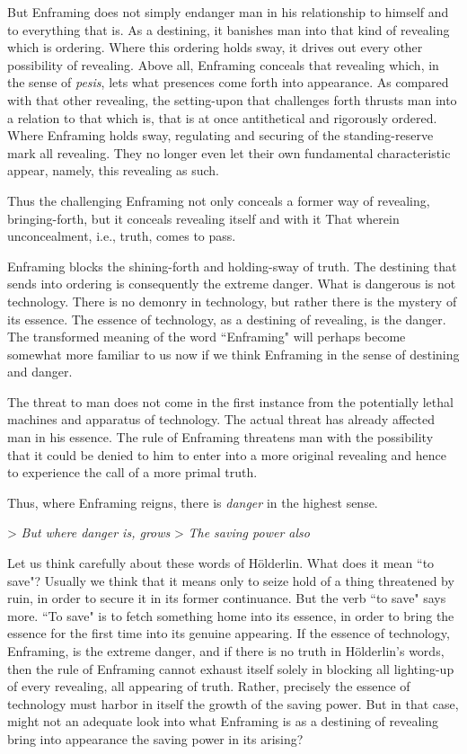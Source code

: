 But Enframing does not simply endanger man in his relationship to himself and to everything that is. As a destining, it banishes man into that kind of revealing which is ordering. Where this ordering holds sway, it drives out every other possibility of revealing. Above all, Enframing conceals that revealing which, in the sense of \textit{pesis}, lets what presences come forth into appearance. As compared with that other revealing, the setting-upon that challenges forth thrusts man into a relation to that which is, that is at once antithetical and rigorously ordered. Where Enframing holds sway, regulating and securing of the standing-reserve mark all revealing. They no longer even let their own fundamental characteristic appear, namely, this revealing as such.

Thus the challenging Enframing not only conceals a former way of revealing, bringing-forth, but it conceals revealing itself and with it That wherein unconcealment, i.e., truth, comes to pass.

Enframing blocks the shining-forth and holding-sway of truth. The destining that sends into ordering is consequently the extreme danger. What is dangerous is not technology. There is no demonry in technology, but rather there is the mystery of its essence. The essence of technology, as a destining of revealing, is the danger. The transformed meaning of the word ``Enframing" will perhaps become somewhat more familiar to us now if we think Enframing in the sense of destining and danger.

The threat to man does not come in the first instance from the potentially lethal machines and apparatus of technology. The actual threat has already affected man in his essence. The rule of Enframing threatens man with the possibility that it could be denied to him to enter into a more original revealing and hence to experience the call of a more primal truth.

Thus, where Enframing reigns, there is \textit{danger} in the highest sense.

> \textit{But where danger is, grows}
> \textit{The saving power also}

Let us think carefully about these words of H\"{o}lderlin. What does it mean ``to save"? Usually we think that it means only to seize hold of a thing threatened by ruin, in order to secure it in its former continuance. But the verb ``to save" says more. ``To save" is to fetch something home into its essence, in order to bring the essence for the first time into its genuine appearing. If the essence of technology, Enframing, is the extreme danger, and if there is no truth in H\"{o}lderlin's words, then the rule of Enframing cannot exhaust itself solely in blocking all lighting-up of every revealing, all appearing of truth. Rather, precisely the essence of technology must harbor in itself the growth of the saving power. But in that case, might not an adequate look into what Enframing is as a destining of revealing bring into appearance the saving power in its arising? 

